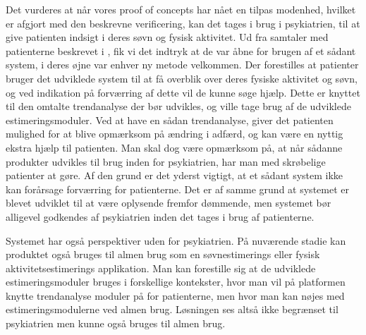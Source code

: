 Det vurderes at når vores proof of concepts har nået en tilpas modenhed, hvilket er afgjort med den beskrevne verificering, kan det tages i brug i psykiatrien, til at give patienten indsigt i deres søvn og fysisk aktivitet. 
Ud fra samtaler med patienterne beskrevet i \citet{misc:faellesrapp}, fik vi det indtryk at de var åbne for brugen af et sådant system, i deres øjne var enhver ny metode velkommen.
Der forestilles at patienter bruger det udviklede system til at få overblik over deres fysiske aktivitet og søvn, og ved indikation på forværring af dette vil de kunne søge hjælp. 
Dette er knyttet til den omtalte trendanalyse der bør udvikles, og ville tage brug af de udviklede estimeringsmoduler.
Ved at have en sådan trendanalyse, giver det patienten mulighed for at blive opmærksom på ændring i adfærd, og kan være en nyttig ekstra hjælp til patienten.
Man skal dog være opmærksom på, at når sådanne produkter udvikles til brug inden for psykiatrien, har man med skrøbelige patienter at gøre.
Af den grund er det yderst vigtigt, at et sådant system ikke kan forårsage forværring for patienterne.
Det er af samme grund at systemet er blevet udviklet til at være oplysende fremfor dømmende, men systemet bør alligevel godkendes af psykiatrien inden det tages i brug af patienterne.

Systemet har også perspektiver uden for psykiatrien.
På nuværende stadie kan produktet også bruges til almen brug som en søvnestimerings eller fysisk aktivitetsestimerings applikation.
Man kan forestille sig at de udviklede estimeringsmoduler bruges i forskellige kontekster, hvor man vil på platformen knytte trendanalyse moduler på for patienterne, men hvor man kan nøjes med estimeringsmodulerne ved almen brug.
Løsningen ses altså ikke begrænset til psykiatrien men kunne også bruges til almen brug.

